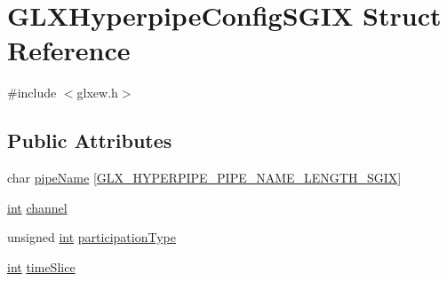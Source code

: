 \hypertarget{struct_g_l_x_hyperpipe_config_s_g_i_x}{\section{G\-L\-X\-Hyperpipe\-Config\-S\-G\-I\-X Struct Reference}
\label{struct_g_l_x_hyperpipe_config_s_g_i_x}
}


{\ttfamily \#include $<$glxew.\-h$>$}

\subsection*{Public Attributes}
\begin{DoxyCompactItemize}
\item 
char \hyperlink{struct_g_l_x_hyperpipe_config_s_g_i_x_a35b03a5796f020067d0f463aa32a7c2d}{pipe\-Name} \mbox{[}\hyperlink{_g_l_tools_2include_2_g_l_2glxew_8h_ae1c8261c0861010d8003a31d07e26005}{G\-L\-X\-\_\-\-H\-Y\-P\-E\-R\-P\-I\-P\-E\-\_\-\-P\-I\-P\-E\-\_\-\-N\-A\-M\-E\-\_\-\-L\-E\-N\-G\-T\-H\-\_\-\-S\-G\-I\-X}\mbox{]}
\item 
\hyperlink{_s_d_l__thread_8h_a6a64f9be4433e4de6e2f2f548cf3c08e}{int} \hyperlink{struct_g_l_x_hyperpipe_config_s_g_i_x_abc812d8796ba89d5de4e33b3532d8335}{channel}
\item 
unsigned \hyperlink{_s_d_l__thread_8h_a6a64f9be4433e4de6e2f2f548cf3c08e}{int} \hyperlink{struct_g_l_x_hyperpipe_config_s_g_i_x_a093cfaaec305531f66e1120929b5b01b}{participation\-Type}
\item 
\hyperlink{_s_d_l__thread_8h_a6a64f9be4433e4de6e2f2f548cf3c08e}{int} \hyperlink{struct_g_l_x_hyperpipe_config_s_g_i_x_afe9288e75dc1ae5e0f33eff978d7024d}{time\-Slice}
\end{DoxyCompactItemize}


